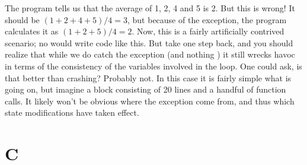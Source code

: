 The program tells us that the average of 1, 2, 4 and 5 is 2. But this is wrong! It should be $(1+2+4+5)/4=3$, but because of the exception, the program calculates it as $(1+2+5)/4=2$. Now, this is a fairly artificially contrived scenario; no  would write code like this. But take one step back, and you should realize that while we do catch the exception (and nothing ) it still wrecks havoc in terms of the consistency of the variables involved in the loop. One could ask, is that better than crashing? Probably not. In this case it is fairly simple what is going on, but imagine a  block consisting of 20 lines and a handful of function calls. It likely won't be obvious where the exception come from, and thus which state modifications have taken effect.

\section{C}

